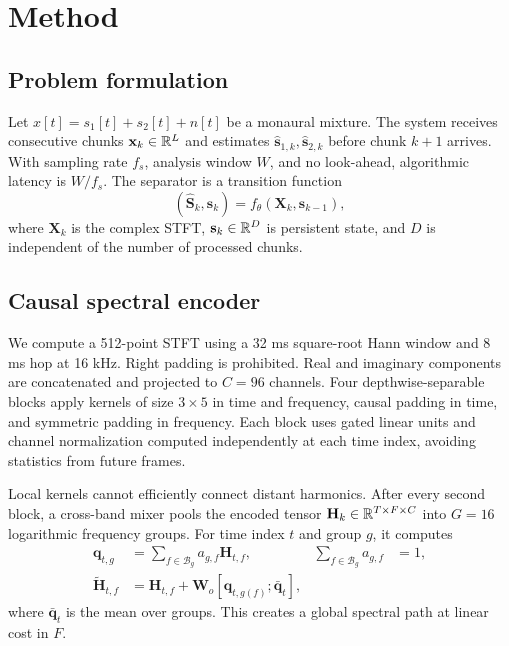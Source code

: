 \section{Method}
\label{sec:method}

\subsection{Problem formulation}

Let $x[t]=s_1[t]+s_2[t]+n[t]$ be a monaural mixture.  The system receives
consecutive chunks $\mathbf{x}_k\in\mathbb{R}^L$ and estimates
$\hat{\mathbf{s}}_{1,k},\hat{\mathbf{s}}_{2,k}$ before chunk $k+1$ arrives.
With sampling rate $f_s$, analysis window $W$, and no look-ahead, algorithmic
latency is $W/f_s$.  The separator is a transition function
\begin{equation}
  (\hat{\mathbf{S}}_k,\mathbf{s}_k)
  = f_\theta(\mathbf{X}_k,\mathbf{s}_{k-1}),
  \label{eq:transition}
\end{equation}
where $\mathbf{X}_k$ is the complex STFT, $\mathbf{s}_k\in\mathbb{R}^D$ is persistent
state, and $D$ is independent of the number of processed chunks.

\subsection{Causal spectral encoder}

We compute a 512-point STFT using a 32 ms square-root Hann window and 8 ms hop at
16 kHz.  Right padding is prohibited.  Real and imaginary components are
concatenated and projected to $C=96$ channels.  Four depthwise-separable blocks
apply kernels of size $3\times5$ in time and frequency, causal padding in time,
and symmetric padding in frequency.  Each block uses gated linear units and
channel normalization computed independently at each time index, avoiding
statistics from future frames.

Local kernels cannot efficiently connect distant harmonics.  After every second
block, a cross-band mixer pools the encoded tensor
$\mathbf{H}_k\in\mathbb{R}^{T\times F\times C}$ into $G=16$ logarithmic frequency groups.
For time index $t$ and group $g$, it computes
\begin{align}
 \mathbf{q}_{t,g} &= \sum_{f\in\mathcal{B}_g} a_{g,f}\mathbf{H}_{t,f},
 &\sum_{f\in\mathcal{B}_g}a_{g,f}&=1, \\
 \widetilde{\mathbf{H}}_{t,f} &= \mathbf{H}_{t,f}
   + \mathbf{W}_o[\mathbf{q}_{t,g(f)};\bar{\mathbf{q}}_t],
 \label{eq:mixer}
\end{align}
where $\bar{\mathbf{q}}_t$ is the mean over groups.  This creates a global
spectral path at linear cost in $F$.

